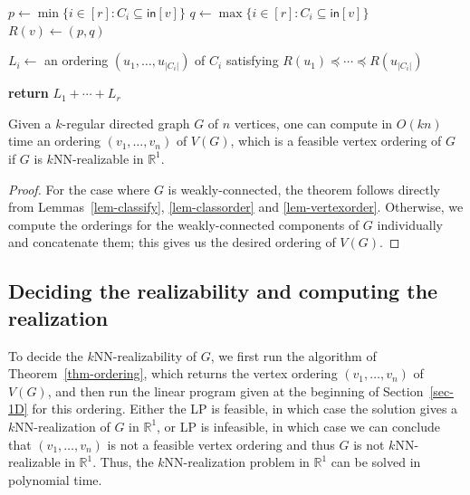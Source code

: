 \documentclass[english]{lipics-v2021}
\begin{document}
\begin{algorithm}[htbp]
    \caption{\textsc{VertexOrder}$(G,(C_1,\dots,C_r))$}
    \begin{algorithmic}[1]
            \State $p \leftarrow \min\{i \in [r]: C_i \subseteq \mathsf{in}[v]\}$
            \State $q \leftarrow \max\{i \in [r]: C_i \subseteq \mathsf{in}[v]\}$
            \State $R(v) \leftarrow (p,q)$
            \begin{nolinenumbers}
            \end{nolinenumbers}
        \EndFor
            \State $L_i \leftarrow$ an ordering $(u_1,\dots,u_{|C_i|})$ of $C_i$ satisfying $R(u_1) \preceq \cdots \preceq R(u_{|C_i|})$
            \begin{nolinenumbers}
            \end{nolinenumbers}
        \EndFor
        \State \textbf{return} $L_1+\cdots+L_r$
    \end{algorithmic}
    \label{alg-vertexorder}
\end{algorithm}

\begin{theorem} \label{thm-ordering}
Given a $k$-regular directed graph $G$ of $n$ vertices, one can compute in $O(kn)$ time an ordering $(v_1,\dots,v_n)$ of $V(G)$, which is a feasible vertex ordering of $G$ if $G$ is $k$NN-realizable in $\mathbb{R}^1$.
\end{theorem}
\begin{proof}
For the case where $G$ is weakly-connected, the theorem follows directly from Lemmas~\ref{lem-classify}, \ref{lem-classorder} and \ref{lem-vertexorder}.
Otherwise, we compute the orderings for the weakly-connected components of $G$ individually and concatenate them; this gives us the desired ordering of $V(G)$.
\end{proof}

\subsection{Deciding the realizability and computing the realization}

To decide the $k$NN-realizability of $G$, we first run the algorithm of Theorem~\ref{thm-ordering}, which returns the vertex ordering $(v_1,\dots,v_n)$ of $V(G)$, and then run the linear program given at the beginning of Section~\ref{sec-1D} for this ordering.
Either the LP is feasible, in which case the solution gives a $k$NN-realization of $G$ in $\mathbb{R}^1$, or LP is infeasible, in which case we can conclude that $(v_1,\dots,v_n)$ is not a feasible vertex ordering and thus $G$ is not $k$NN-realizable in $\mathbb{R}^1$. Thus, the $k$NN-realization problem in $\mathbb{R}^1$ can be solved in polynomial time.
\end{document}
